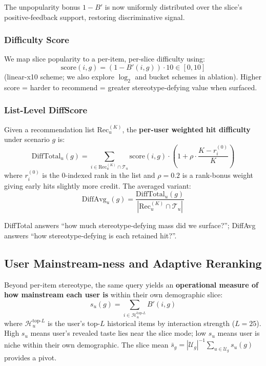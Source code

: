 The unpopularity bonus $1 - B'$ is now uniformly distributed over the slice's positive-feedback support, restoring discriminative signal.

\subsubsection{Difficulty Score}

We map slice popularity to a per-item, per-slice difficulty using:
\begin{equation}
\text{score}(i, g) = (1 - B'(i, g)) \cdot 10 \in [0, 10]
\label{eq:linear-x10}
\end{equation}
(linear-x10 scheme; we also explore $\log_2$ and bucket schemes in ablation). Higher score = harder to recommend = greater stereotype-defying value when surfaced.

\subsubsection{List-Level DiffScore}

Given a recommendation list $\text{Rec}_u^{(K)}$, the \textbf{per-user weighted hit difficulty} under scenario $g$ is:
\begin{equation}
\text{DiffTotal}_u(g) = \sum_{i \in \text{Rec}_u^{(K)} \cap \mathcal{T}_u} \text{score}(i, g) \cdot \!\left(1 + \rho \cdot \frac{K - r_i^{(0)}}{K}\right)
\label{eq:difftotal}
\end{equation}
where $r_i^{(0)}$ is the 0-indexed rank in the list and $\rho = 0.2$ is a rank-bonus weight giving early hits slightly more credit. The averaged variant:
\begin{equation}
\text{DiffAvg}_u(g) = \frac{\text{DiffTotal}_u(g)}{|\text{Rec}_u^{(K)} \cap \mathcal{T}_u|}
\end{equation}

DiffTotal answers ``how much stereotype-defying mass did we surface?''; DiffAvg answers ``how stereotype-defying is each retained hit?''.

\subsection{User Mainstream-ness and Adaptive Reranking}
\label{subsec:mainstream}

Beyond per-item stereotype, the same query yields an \textbf{operational measure of how mainstream each user is} within their own demographic slice:
\begin{equation}
s_u(g) = \sum_{i \in \mathcal{H}_u^{\text{top-}L}} B'(i, g)
\label{eq:user-mainstream}
\end{equation}
where $\mathcal{H}_u^{\text{top-}L}$ is the user's top-$L$ historical items by interaction strength ($L = 25$). High $s_u$ means user's revealed taste lies near the slice mode; low $s_u$ means user is niche within their own demographic. The slice mean $\bar{s}_g = |\mathcal{U}_g|^{-1} \sum_{u \in \mathcal{U}_g} s_u(g)$ provides a pivot.

